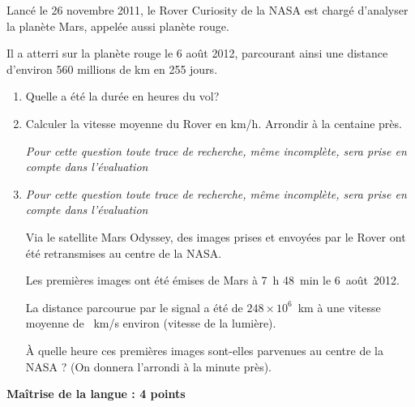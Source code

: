 
\medskip

Lancé le 26 novembre 2011, le Rover Curiosity de la NASA est chargé d'analyser la planète Mars, appelée aussi planète rouge.
 
Il a atterri sur la planète rouge le 6 août 2012, parcourant ainsi une distance d'environ 560 millions de km en 255 jours.

\medskip
 
\begin{enumerate}
\item Quelle a été la durée en heures du vol? 
\item Calculer la vitesse moyenne du Rover en km/h. Arrondir à la centaine près.
 
\emph{Pour cette question toute trace de recherche, même incomplète, sera prise en compte dans l'évaluation} 
\item \emph{Pour cette question toute trace de recherche, même incomplète, sera prise en compte dans l'évaluation}

Via le satellite Mars Odyssey, des images prises et envoyées par le Rover ont été retransmises au centre de la NASA.
 
Les premières images ont été émises de Mars à 7~h 48~min le 6~août~2012.
 
La distance parcourue par le signal a été de $248 \times 10^6$~km à une vitesse moyenne de ~km/s environ (vitesse de la lumière).
 
À quelle heure ces premières images sont-elles parvenues au centre de la NASA ? (On donnera l'arrondi à la minute près). 
\end{enumerate}

\medskip

\textbf{Maîtrise de la langue : 4 points}
